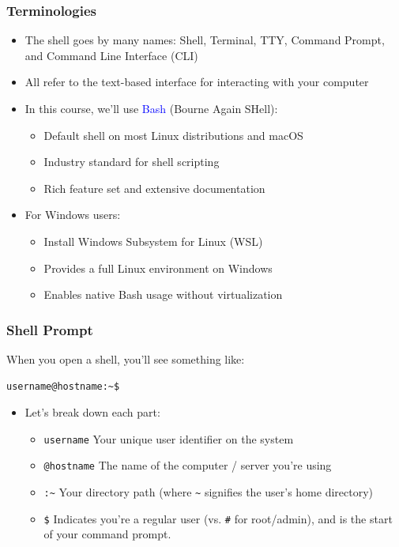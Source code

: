 \documentclass[10pt]{beamer}
\begin{document}
\begin{frame}
    \frametitle{Terminologies}
    \begin{itemize}
        \item The shell goes by many names: Shell, Terminal, TTY, Command Prompt, and Command Line Interface (CLI)
        \item All refer to the text-based interface for interacting with your computer
        \item In this course, we'll use \textcolor{blue}{Bash} (Bourne Again SHell):
        \begin{itemize}
            \item Default shell on most Linux distributions and macOS
            \item Industry standard for shell scripting
            \item Rich feature set and extensive documentation
        \end{itemize}
        \item For Windows users:
        \begin{itemize}
            \item Install Windows Subsystem for Linux (WSL)
            \item Provides a full Linux environment on Windows
            \item Enables native Bash usage without virtualization
        \end{itemize}
    \end{itemize}
\end{frame}

\begin{frame}[fragile]
    \frametitle{Shell Prompt}
    When you open a shell, you'll see something like:
\begin{verbatim}
username@hostname:~$
\end{verbatim}
    \begin{itemize}
        \item Let's break down each part:
        \begin{itemize}
            \item \colorbox{gray!20}{\texttt{username}} Your unique user identifier on the system
            \item \colorbox{gray!20}{\texttt{@hostname}} The name of the computer / server you're using
            \item \colorbox{gray!20}{\texttt{:{\textasciitilde}}} Your directory path (where \colorbox{gray!20}{\texttt{\textasciitilde}} signifies the user's home directory)
            \item \colorbox{gray!20}{\texttt{\$}} Indicates you're a regular user (vs. \colorbox{gray!20}{\texttt{\#}} for root/admin), and is the start of your command prompt.
        \end{itemize}
    \end{itemize}
\end{frame}
\end{document}
